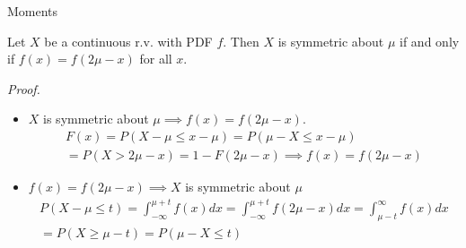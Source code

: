 \documentclass[8pt]{beamer}
\newcommand{\ti}[1]{\textit{#1}}
\begin{document}
\begin{frame}{Moments}
    \begin{lemma}
        Let $X$ be a continuous r.v. with PDF $f$. Then $X$ is symmetric about $\mu$ if and only if $f(x) = f(2\mu - x)$ for all $x$.
    \end{lemma}

    \ti{Proof.}
    \begin{itemize}
        \item $X$ is symmetric about $\mu \implies f(x) = f(2\mu - x)$. 
        \[
        \begin{gathered}
            F(x) = P(X- \mu \leq x - \mu)  = P(\mu - X \leq x - \mu) \\
            = P(X > 2\mu - x) = 1 - F(2\mu - x)
            \implies f(x) = f(2\mu - x)
        \end{gathered}
        \]
        \item $f(x) = f(2\mu - x) \implies X$ is symmetric about $\mu$
        \[
        \begin{gathered}
            P(X-\mu \leq t) = \int_{-\infty}^{\mu +t} f(x) dx = \int_{-\infty}^{\mu +t} f(2\mu - x)dx = \int_{\mu - t}^{\infty} f(x) dx \\
            = P(X \geq \mu - t) = P(\mu -X \leq t)
        \end{gathered}
        \]
    \end{itemize}
\end{frame}
\end{document}
